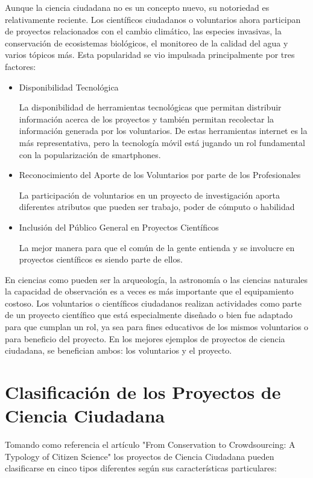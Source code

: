 	Aunque la ciencia ciudadana no es un concepto nuevo, su notoriedad es relativamente reciente. Los científicos ciudadanos o voluntarios ahora participan de proyectos relacionados con el cambio climático, las especies invasivas, la conservación de ecosistemas biológicos, el monitoreo de la calidad del agua y varios tópicos más. Esta popularidad se vio impulsada principalmente por tres factores:

\begin{itemize}
	\item {Disponibilidad Tecnológica}
	
	La disponibilidad de herramientas tecnológicas que permitan distribuir información acerca de los proyectos y también permitan recolectar la información generada por los voluntarios. De estas herramientas internet es la más representativa, pero la tecnología móvil está jugando un rol fundamental con la popularización de smartphones. \cite{silvertown2009new}	
	\item {Reconocimiento del Aporte de los Voluntarios por parte de los Profesionales}
	
	La participación de voluntarios en un proyecto de investigación aporta diferentes atributos que pueden ser trabajo, poder de cómputo o habilidad \cite{cohn2008citizen}
	\item {Inclusión del Público General en Proyectos Científicos}
	
	La mejor manera para que el común de la gente entienda y se involucre en proyectos científicos es siendo parte de ellos. \cite{silvertown2009new}
\end{itemize} 

	En ciencias como pueden ser la arqueología, la astronomía o las ciencias naturales la capacidad de observación es a veces es más importante que el equipamiento costoso. Los voluntarios o científicos ciudadanos realizan actividades como parte de un proyecto científico que está especialmente diseñado o bien fue adaptado para que cumplan un rol, ya sea para fines educativos de los mismos voluntarios o para beneficio del proyecto. En los mejores ejemplos de proyectos de ciencia ciudadana, se benefician ambos: los voluntarios y el proyecto.\cite{silvertown2009new}


\section{Clasificación de los Proyectos de Ciencia Ciudadana}
	
	Tomando como referencia el artículo "From Conservation to Crowdsourcing: A Typology of Citizen Science" los proyectos de Ciencia Ciudadana pueden clasificarse en cinco tipos diferentes según sus características particulares:

